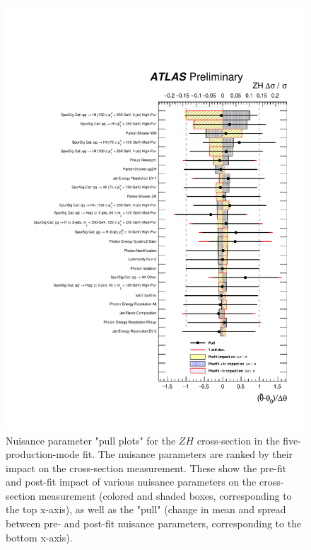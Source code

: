 \begin{figure}[htbp]
  \centering
  \includegraphics[width=0.9\linewidth]{figures/couplings_chapter/pulls_mu_ZH}
  \caption{Nuisance parameter "pull plots" for the $ZH$ cross-section in the five-production-mode fit. The nuisance parameters are ranked by their impact on the cross-section measurement. These show the pre-fit and post-fit impact of various nuisance parameters on the cross-section measurement (colored and shaded boxes, corresponding to the top x-axis), as well as the "pull" (change in mean and spread between pre- and post-fit nuisance parameters, corresponding to the bottom x-axis).}
  \label{fig:ranking_ZH}
\end{figure}


